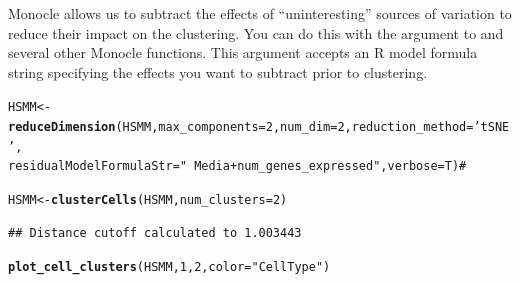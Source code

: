 \documentclass[10pt,oneside]{article}\usepackage[]{graphicx}\usepackage[]{color}
\makeatletter
\newcommand{\hlnum}[1]{\textcolor[rgb]{0.686,0.059,0.569}{#1}}%
\newcommand{\hlstr}[1]{\textcolor[rgb]{0.192,0.494,0.8}{#1}}%
\newcommand{\hlcom}[1]{\textcolor[rgb]{0.678,0.584,0.686}{\textit{#1}}}%
\newcommand{\hlstd}[1]{\textcolor[rgb]{0.345,0.345,0.345}{#1}}%
\newcommand{\hlkwb}[1]{\textcolor[rgb]{0.69,0.353,0.396}{#1}}%
\newcommand{\hlkwc}[1]{\textcolor[rgb]{0.333,0.667,0.333}{#1}}%
\newcommand{\hlkwd}[1]{\textcolor[rgb]{0.737,0.353,0.396}{\textbf{#1}}}%
\newenvironment{kframe}{%
 \def\at@end@of@kframe{}%
 \ifinner\ifhmode%
  \def\at@end@of@kframe{\end{minipage}}%
  \begin{minipage}{\columnwidth}%
 \fi\fi%
 \def\FrameCommand##1{\hskip\@totalleftmargin \hskip-\fboxsep
 \colorbox{shadecolor}{##1}\hskip-\fboxsep
     \hskip-\linewidth \hskip-\@totalleftmargin \hskip\columnwidth}%
 \MakeFramed {\advance\hsize-\width
   \@totalleftmargin\z@ \linewidth\hsize
   \@setminipage}}%
 {\par\unskip\endMakeFramed%
 \at@end@of@kframe}
\newenvironment{knitrout}{}{} %
\makeatother
\begin{document}
Monocle allows us to subtract the effects of ``uninteresting'' sources of variation to reduce their impact on the clustering. You can do this with the  argument to  and several other Monocle functions. This argument accepts an R model formula string specifying the effects you want to subtract prior to clustering.

\begin{knitrout}
\color{fgcolor}\begin{kframe}
\begin{alltt}
\hlstd{HSMM} \hlkwb{<-} \hlkwd{reduceDimension}\hlstd{(HSMM,} \hlkwc{max_components}\hlstd{=}\hlnum{2}\hlstd{,} \hlkwc{num_dim} \hlstd{=} \hlnum{2}\hlstd{,} \hlkwc{reduction_method} \hlstd{=} \hlstr{'tSNE'}\hlstd{,}
                       \hlkwc{residualModelFormulaStr}\hlstd{=}\hlstr{"~Media + num_genes_expressed"}\hlstd{,} \hlkwc{verbose} \hlstd{= T)} \hlcom{#}
\end{alltt}


{\ttfamily\noindent\itshape\color{messagecolor}{\#\# Removing batch effects}}

{\ttfamily\noindent\itshape\color{messagecolor}{\#\# Remove noise by PCA ...}}

{\ttfamily\noindent\itshape\color{messagecolor}{\#\# Reduce dimension by tSNE ...}}\begin{alltt}
\hlstd{HSMM} \hlkwb{<-} \hlkwd{clusterCells}\hlstd{(HSMM,} \hlkwc{num_clusters}\hlstd{=}\hlnum{2}\hlstd{)}
\end{alltt}
\begin{verbatim}
## Distance cutoff calculated to 1.003443
\end{verbatim}


{\ttfamily\noindent\itshape\color{messagecolor}{\#\# the length of the distance: 34191}}\begin{alltt}
\hlkwd{plot_cell_clusters}\hlstd{(HSMM,} \hlnum{1}\hlstd{,} \hlnum{2}\hlstd{,} \hlkwc{color}\hlstd{=}\hlstr{"CellType"}\hlstd{)}
\end{alltt}
\end{kframe}


\end{knitrout}
\end{document}

